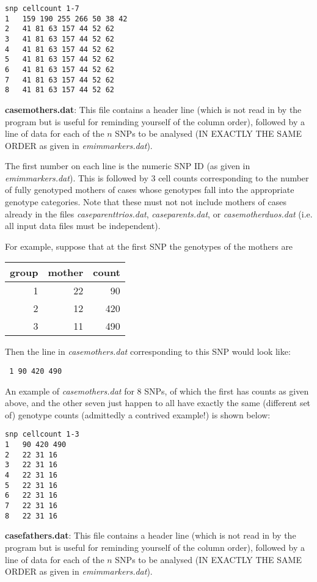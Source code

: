 \documentclass[a4paper,11pt]{report}
\begin{document}
\newpage
\begin{verbatim}
snp	cellcount 1-7
1 	159 190 255 266 50 38 42
2 	41 81 63 157 44 52 62
3 	41 81 63 157 44 52 62
4 	41 81 63 157 44 52 62
5 	41 81 63 157 44 52 62
6 	41 81 63 157 44 52 62
7 	41 81 63 157 44 52 62
8 	41 81 63 157 44 52 62
\end{verbatim}
 
\bigskip

	{\bf  casemothers.dat}:  This file contains a header line
(which is not read in by the program but is useful for reminding
yourself of the  column order), followed by a line of data
for each of the $n$ SNPs to be analysed (IN EXACTLY THE SAME ORDER
as given in {\it emimmarkers.dat}).

The first number on each line is the numeric SNP ID (as given in {\it emimmarkers.dat}). This is followed by 3 cell counts corresponding to the number
of fully genotyped mothers of cases whose genotypes 
fall into the appropriate genotype categories. Note that these
must not not include mothers of cases already
in the files {\it  caseparenttrios.dat}, {\it  caseparents.dat},
or {\it  casemotherduos.dat} (i.e. all input data files must be
independent).


For example, suppose that at the first SNP the genotypes of the mothers are

\begin{tabular}{rrr} 
group    &   mother &count \\ \hline
1     &  22   &   90\\
2     &  12   &   420\\
3     &  11   &   490\\
\end{tabular}

Then the line in	{\it  casemothers.dat} corresponding to this SNP 
would look like:

{\tt
1 	90 420 490
}

An example of {\it  casemothers.dat} for 8 SNPs, of which the first has counts as given above, and the other seven just happen to all have exactly the same (different set of) genotype counts (admittedly a contrived example!) is shown below:

\begin{verbatim}
snp	cellcount 1-3
1 	90 420 490
2 	22 31 16
3 	22 31 16
4 	22 31 16
5 	22 31 16
6 	22 31 16
7 	22 31 16
8 	22 31 16
\end{verbatim}
 
\bigskip

	{\bf  casefathers.dat}:  This file contains a header line
(which is not read in by the program but is useful for reminding
yourself of the  column order), followed by a line of data
for each of the $n$ SNPs to be analysed (IN EXACTLY THE SAME ORDER
as given in {\it emimmarkers.dat}).
\end{document}
